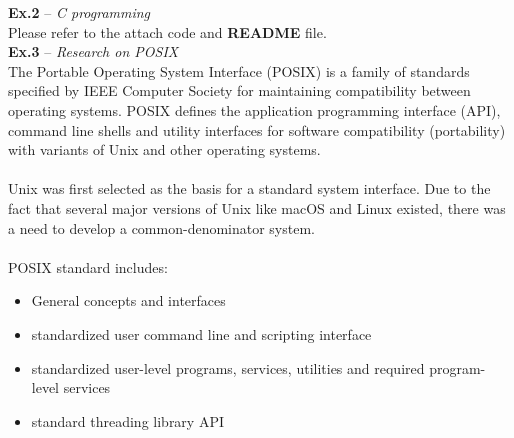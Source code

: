\documentclass{article}
\begin{document}
\noindent\textbf{Ex.2} -- \textit{C programming}\\
Please refer to the attach code and \textbf{README} file.\\

\noindent\textbf{Ex.3} -- \textit{Research on POSIX}\\
The Portable Operating System Interface (POSIX) is a family of standards specified by IEEE Computer Society for maintaining compatibility between operating systems. POSIX defines the application programming interface (API), command line shells and utility interfaces for software compatibility (portability) with variants of Unix and other operating systems.\\ \\
Unix was first selected as the basis for a standard system interface. Due to the fact that several major versions of Unix like macOS and Linux existed, there was a need to develop a common-denominator system.\\ \\
POSIX standard includes:
\begin{itemize}
\item
General concepts and interfaces
\item
standardized user command line and scripting interface
\item
standardized user-level programs, services, utilities and required program-level services
\item
standard threading library API
\end{itemize}
\end{document}
